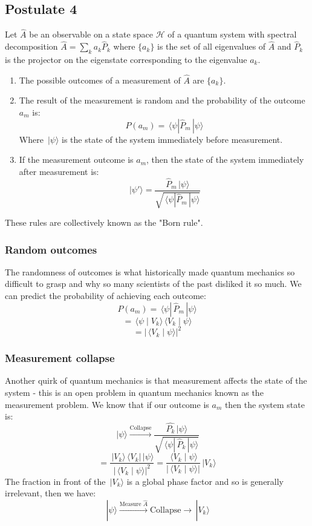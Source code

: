 \documentclass[12pt]{article}
\newcommand{\ket}[1]{\,|#1\rangle}
\newcommand{\bra}[1]{\,\langle #1|}
\newcommand{\braket}[2]{\,\langle #1\mid #2\rangle}
\begin{document}
\subsection*{Postulate 4}
Let \(\hat{A}\) be an observable on a state space \(\mathcal{H}\) of a quantum system with spectral decomposition \(\hat{A}=\sum_ka_k\hat{P}_k\) where \(\{a_k\}\) is the set of all eigenvalues of \(\hat{A}\) and \(\hat{P}_k\) is the projector on the eigenstate corresponding to the eigenvalue \(a_k\).
\begin{enumerate}
    \item The possible outcomes of a measurement of \(\hat{A}\) are \(\{a_k\}\).
    \item The result of the measurement is random and the probability of the outcome \(a_m\) is:
    \[P(a_m)=\bra{\psi}\hat{P}_m\ket{\psi}\]
    Where \(\ket{\psi}\) is the state of the system immediately before measurement.
    \item If the measurement outcome is \(a_m\), then the state of the system immediately after measurement is:
    \[\ket{\psi'}=\frac{\hat{P}_m\ket{\psi}}{\sqrt{\bra{\psi}\hat{P}_m\ket{\psi}}}\]
\end{enumerate}
These rules are collectively known as the "Born rule".
\subsubsection*{Random outcomes}
The randomness of outcomes is what historically made quantum mechanics so difficult to grasp and why so many scientists of the past disliked it so much. We can predict the probability of achieving each outcome:
\[P(a_m)=\bra{\psi}\,\hat{P}_m\ket{\psi}\]
\[=\braket{\psi}{V_k}\braket{V_k}{\psi}\]
\[=|\braket{V_k}{\psi}|^2\]
\subsubsection*{Measurement collapse}
Another quirk of quantum mechanics is that measurement affects the state of the system - this is an open problem in quantum mechanics known as the measurement problem. We know that if our outcome is \(a_m\) then the system state is:
\[\ket{\psi}\overset{\text{Collapse}}{\longrightarrow}\frac{\hat{P_k}\ket{\psi}}{\sqrt{\bra{\psi}\,\hat{P}_k\ket{\psi}}}\]
\[=\frac{\ket{V_k}\bra{V_k}\ket{\psi}}{|\braket{V_k}{\psi}|^2}=\frac{\braket{V_k}{\psi}}{|\braket{V_k}{\psi}|}\ket{V_k}\]
The fraction in front of the \(\ket{V_k}\) is a global phase factor and so is generally irrelevant, then we have:
\[\ket{\psi}\overset{\text{Measure }\hat{A}}{\longrightarrow}\text{Collapse}\longrightarrow\ket{V_k}\]
\end{document}
